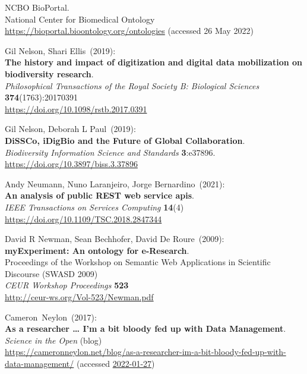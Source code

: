\begin{thebibliography}{9}
NCBO BioPortal.\\
National Center for Biomedical Ontology \\
\url{https://bioportal.bioontology.org/ontologies} (accessed 26 May 2022)

Gil Nelson, Shari Ellis~(2019): \\
\textbf{The history and impact of digitization and digital data mobilization on
biodiversity research}.\\
\emph{Philosophical Transactions of the Royal Society B: Biological Sciences}
\textbf{374}(1763):20170391\\
\url{https://doi.org/10.1098/rstb.2017.0391}

Gil Nelson, Deborah L Paul~(2019): \\
\textbf{DiSSCo, iDigBio and the Future of Global Collaboration}.\\
\emph{Biodiversity Information Science and Standards}
\textbf{3}:e37896.\\
\url{https://doi.org/10.3897/biss.3.37896}

Andy Neumann, Nuno Laranjeiro, Jorge Bernardino~(2021): \\
\textbf{An analysis of public {REST} web service apis}.\\
\emph{IEEE Transactions on Services Computing} \textbf{14}(4)\\
\url{https://doi.org/10.1109/TSC.2018.2847344}

David R Newman, Sean Bechhofer, David De Roure~(2009): \\
\textbf{myExperiment: An ontology for e-Research}.\\
Proceedings of the Workshop on Semantic Web Applications in Scientific Discourse (SWASD 2009)\\
\emph{CEUR Workshop Proceedings} \textbf{523}\\
\url{http://ceur-ws.org/Vol-523/Newman.pdf}

Cameron~Neylon~(2017): \\
\textbf{As a researcher \ldots{} I'm a bit bloody fed up with Data Management}.\\
\emph{Science in the Open} (blog)\\
\url{https://cameronneylon.net/blog/as-a-researcher-im-a-bit-bloody-fed-up-with-data-management/}
(accessed \href{https://web.archive.org/web/20220127113116/https://cameronneylon.net/blog/as-a-researcher-im-a-bit-bloody-fed-up-with-data-management/}{2022-01-27})


\end{thebibliography}
